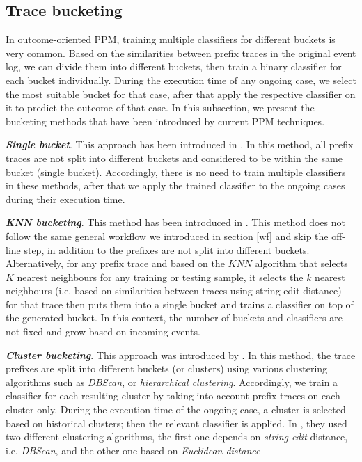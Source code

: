 \subsection{Trace bucketing}
In outcome-oriented PPM, training multiple classifiers for different buckets is very common. Based on the similarities between prefix traces in the original event log, we can divide them into different buckets, then train a binary classifier for each bucket individually. During the execution time of any ongoing case, we select the most suitable bucket for that case, after that apply the respective classifier on it to predict the outcome of that case.  In this subsection,  we present the bucketing methods that have been introduced by current PPM techniques.

\textbf{\textit{Single bucket}}.  This approach has been introduced in \cite{de2016general}. In this method, all prefix traces are not split into different buckets and considered to be within the same bucket (single bucket). Accordingly, there is no need to train multiple classifiers in these methods, after that we apply the trained classifier to the ongoing cases during their execution time.  

\textbf{\textit{KNN bucketing}}. This method has been introduced in \cite{maggi2014predictive}. This method does not follow the same general workflow we introduced in section \ref{wf} and skip the off-line step, in addition to the prefixes are not split into different buckets.  Alternatively, for any prefix trace and based on the $KNN$ algorithm that selects $K$ nearest neighbours for any training or testing sample, it selects the $k$ nearest neighbours (i.e. based on similarities between traces using string-edit distance) for that trace then puts them into a single bucket and trains a classifier on top of the generated bucket. In this context, the number of buckets and classifiers are not fixed and grow based on incoming events.

\textbf{\textit{Cluster bucketing}}.  This approach was introduced by \cite{di2017clustering}. In this method, the trace prefixes are split into different buckets (or clusters) using various clustering algorithms such as \textit{DBScan}, or \textit{hierarchical clustering}. Accordingly, we train a classifier for each resulting cluster by taking into account prefix traces on each cluster only. During the execution time of the ongoing case, a cluster is selected based on historical clusters; then the relevant classifier is applied. In \cite{di2017clustering}, they used two different clustering algorithms, the first one depends on \textit{string-edit} distance, i.e. \textit{DBScan}, and the other one based on \textit{Euclidean distance}


